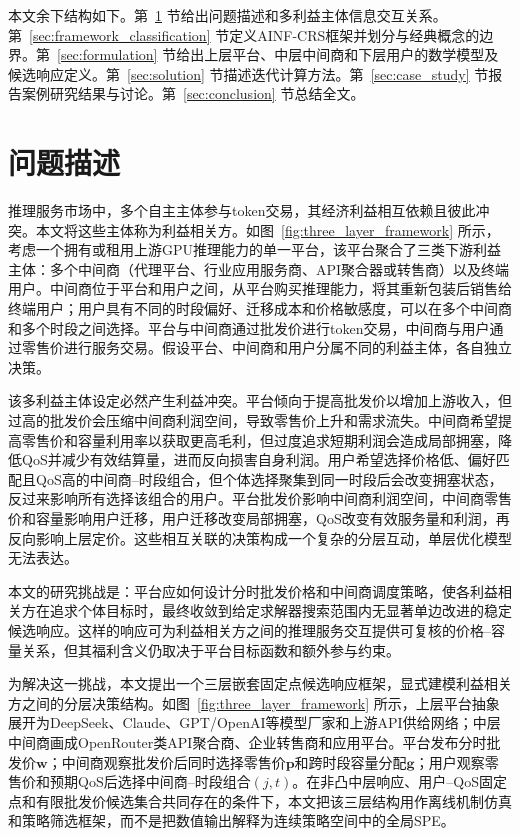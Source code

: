 \documentclass[UTF8,11pt]{ctexart}
\newcommand{\w}{\boldsymbol{w}}
\newcommand{\p}{\boldsymbol{p}}
\newcommand{\g}{\boldsymbol{g}}
\begin{document}
本文余下结构如下。第~\ref{sec:problem} 节给出问题描述和多利益主体信息交互关系。第~\ref{sec:framework_classification} 节定义AINF-CRS框架并划分与经典概念的边界。第~\ref{sec:formulation} 节给出上层平台、中层中间商和下层用户的数学模型及候选响应定义。第~\ref{sec:solution} 节描述迭代计算方法。第~\ref{sec:case_study} 节报告案例研究结果与讨论。第~\ref{sec:conclusion} 节总结全文。

\section{问题描述}
\label{sec:problem}

推理服务市场中，多个自主主体参与token交易，其经济利益相互依赖且彼此冲突。本文将这些主体称为利益相关方。如图~\ref{fig:three_layer_framework} 所示，考虑一个拥有或租用上游GPU推理能力的单一平台，该平台聚合了三类下游利益主体：多个中间商（代理平台、行业应用服务商、API聚合器或转售商）以及终端用户。中间商位于平台和用户之间，从平台购买推理能力，将其重新包装后销售给终端用户；用户具有不同的时段偏好、迁移成本和价格敏感度，可以在多个中间商和多个时段之间选择。平台与中间商通过批发价进行token交易，中间商与用户通过零售价进行服务交易。假设平台、中间商和用户分属不同的利益主体，各自独立决策。

该多利益主体设定必然产生利益冲突。平台倾向于提高批发价以增加上游收入，但过高的批发价会压缩中间商利润空间，导致零售价上升和需求流失。中间商希望提高零售价和容量利用率以获取更高毛利，但过度追求短期利润会造成局部拥塞，降低QoS并减少有效结算量，进而反向损害自身利润。用户希望选择价格低、偏好匹配且QoS高的中间商--时段组合，但个体选择聚集到同一时段后会改变拥塞状态，反过来影响所有选择该组合的用户。平台批发价影响中间商利润空间，中间商零售价和容量影响用户迁移，用户迁移改变局部拥塞，QoS改变有效服务量和利润，再反向影响上层定价。这些相互关联的决策构成一个复杂的分层互动，单层优化模型无法表达。

本文的研究挑战是：平台应如何设计分时批发价格和中间商调度策略，使各利益相关方在追求个体目标时，最终收敛到给定求解器搜索范围内无显著单边改进的稳定候选响应。这样的响应可为利益相关方之间的推理服务交互提供可复核的价格--容量关系，但其福利含义仍取决于平台目标函数和额外参与约束。

为解决这一挑战，本文提出一个三层嵌套固定点候选响应框架，显式建模利益相关方之间的分层决策结构。如图~\ref{fig:three_layer_framework} 所示，上层平台抽象展开为DeepSeek、Claude、GPT/OpenAI等模型厂家和上游API供给网络；中层中间商画成OpenRouter类API聚合商、企业转售商和应用平台。平台发布分时批发价$\w$；中间商观察批发价后同时选择零售价$\p$和跨时段容量分配$\g$；用户观察零售价和预期QoS后选择中间商--时段组合$(j,t)$。在非凸中层响应、用户--QoS固定点和有限批发价候选集合共同存在的条件下，本文把该三层结构用作离线机制仿真和策略筛选框架，而不是把数值输出解释为连续策略空间中的全局SPE。
\end{document}
